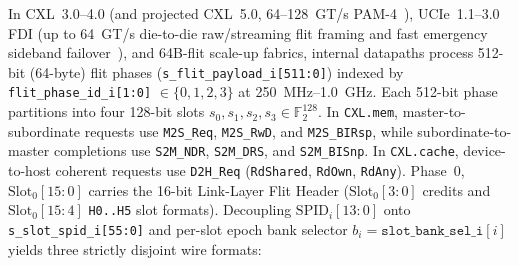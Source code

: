 \documentclass[10pt,twocolumn]{article}
\theoremstyle{spectralthm}
\begin{document}
In \mbox{CXL~3.0--4.0} (and projected \mbox{CXL~5.0}, 64--128~GT/s PAM-4~\cite{cxl2025spec}), \mbox{UCIe~1.1--3.0} FDI (up to 64~GT/s die-to-die raw/streaming flit framing and fast emergency sideband failover~\cite{ucie2025spec30}), and 64B-flit scale-up fabrics, internal datapaths process 512-bit (64-byte) flit phases (\texttt{s\_flit\_payload\_i[511:0]}) indexed by \texttt{flit\_phase\_id\_i[1:0]} $\in \{0,1,2,3\}$ at 250~MHz--1.0~GHz. Each 512-bit phase partitions into four 128-bit slots $s_0, s_1, s_2, s_3 \in \mathbb{F}_2^{128}$. In \texttt{CXL.mem}, master-to-subordinate requests use \texttt{M2S\_Req}, \texttt{M2S\_RwD}, and \texttt{M2S\_BIRsp}, while subordinate-to-master completions use \texttt{S2M\_NDR}, \texttt{S2M\_DRS}, and \texttt{S2M\_BISnp}. In \texttt{CXL.cache}, device-to-host coherent requests use \texttt{D2H\_Req} (\texttt{RdShared}, \texttt{RdOwn}, \texttt{RdAny}). Phase~0, $\mathrm{Slot}_0[15:0]$ carries the 16-bit Link-Layer Flit Header ($\mathrm{Slot}_0[3:0]$ credits and $\mathrm{Slot}_0[15:4]$ \texttt{H0..H5} slot formats). Decoupling $\mathrm{SPID}_i[13:0]$ onto \texttt{s\_slot\_spid\_i[55:0]} and per-slot epoch bank selector $b_i = \texttt{slot\_bank\_sel\_i}[i]$ yields three strictly disjoint wire formats:
\end{document}
